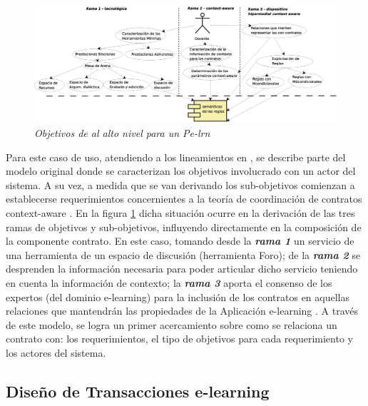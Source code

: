 	\begin{figure}[!h]
        	\begin{center}
		\includegraphics[width= 5 in,totalheight=3
in]{Requerimientos.eps}
                \caption{\small \sl Objetivos de al alto nivel para un Pe-lrn}
\label{requerimientos}
         	\end{center}
         \end{figure}

Para este caso de uso, atendiendo a los lineamientos en \cite{libro}, se
describe parte del modelo original donde se caracterizan los objetivos
involucrado con un actor del sistema. A su vez, a medida que se van derivando
los sub-objetivos comienzan a establecerse requerimientos concernientes a la
teoría de coordinación de contratos context-aware \cite{libro5,fiadeiro}. En la
figura \ref{requerimientos} dicha situación ocurre en la derivación de las tres
ramas de objetivos y sub-objetivos, influyendo directamente en la composición de
la componente contrato. En este caso, tomando desde la \textit{\textbf{rama 1}}
un servicio de una herramienta de un espacio de discusión (herramienta Foro); de
la \textit{\textbf{rama 2}} se desprenden la información necesaria para poder
articular dicho servicio teniendo en cuenta la información de contexto;  la
\textit{\textbf{rama 3}} aporta el consenso de los expertos (del dominio
e-learning) para la inclusión de los contratos en aquellas relaciones que
mantendrán las propiedades de la Aplicación e-learning \cite{libro5}. A través
de este modelo, se logra un primer acercamiento sobre como se relaciona un
contrato con: los requerimientos, el tipo de objetivos para cada requerimiento y
los actores del sistema. 

\subsection{Diseño de Transacciones e-learning}

